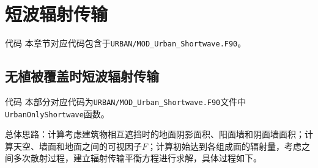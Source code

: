 \section{短波辐射传输}\label{短波辐射传输}
\begin{mymdframed}{代码}
  本章节对应代码包含于\texttt{URBAN/MOD\_Urban\_Shortwave.F90}。
\end{mymdframed}

\subsection{无植被覆盖时短波辐射传输}\label{无植被覆盖时短波辐射传输}
\begin{mymdframed}{代码}
  本部分对应代码为\texttt{URBAN/MOD\_Urban\_Shortwave.F90}文件中\texttt{UrbanOnlyShortwave}函数。
\end{mymdframed}

总体思路：计算考虑建筑物相互遮挡时的地面阴影面积、阳面墙和阴面墙面积；计算天空、墙面和地面之间的可视因子$F$；计算初始达到各组成面的辐射量，考虑之间多次散射过程，建立辐射传输平衡方程进行求解，具体过程如下。

